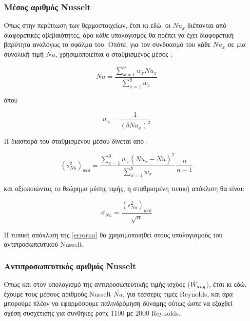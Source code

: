 \subsubsection{Μέσος αριθμός Nusselt}
\noindent Όπως στην περίπτωση των θερμοστοιχείων, έτσι κι εδώ, οι $Nu_x$ διέπονται από διαφορετικές αβεβαιότητες, άρα κάθε υπολογισμός θα πρέπει να έχει διαφορετική βαρύτητα αναλόγως το σφάλμα του. Οπότε, για τον συνδυασμό του κάθε $Nu_x$ σε μια συνολική τιμή $\overline{Nu}$, χρησιμοποιείται ο σταθμισμένος μέσος \parencites{1997_Taylor_BOOK}{2006_James_BOOK}:

\begin{equation}\label{eq:nussavg}
\overline{Nu} = \displaystyle\frac{\displaystyle\sum_{x=1}^{9} w_x Nu_x}{\displaystyle\sum_{x=1}^{9} w_x}
\end{equation}

\noindent όπου

\begin{equation*}
w_x = \displaystyle\frac{1}{\left(\delta Nu_{x}\right)^2}
\end{equation*}

\noindent Η διασπορά του σταθμισμένου μέσου δίνεται από \cite{2003_Bevington_BOOK}:

\begin{equation}\label{eq:nussvar}
\left(s_{Nu} ^2 \right)_{wtd} = \displaystyle\frac{\displaystyle\sum_{x=1}^{9} w_x \left(Nu_x - \overline{Nu}\right)^2}{\displaystyle\sum_{x = 1}^{9} w_x} \, \displaystyle\frac{n}{n-1}
\end{equation}

\noindent και αξιοποιώντας το θεώρημα μέσης τιμής, η σταθμισμένη τυπική απόκλιση θα είναι:

\begin{equation}\label{errornu}
\sigma_{\overline{Nu}} = \displaystyle\frac{\left(s_{Nu} ^2 \right)_{wtd}}{\sqrt{n}}
\end{equation}

\noindent Η τυπική απόκλιση της \ref{errornu} θα χρησιμοποιηθεί στους υπολογισμούς του αντιπροσωπευτικού Nusselt.

\subsubsection{Αντιπροσωπευτικός αριθμός Nusselt}\label{repnu}

\noindent Όπως και στον υπολογισμό της αντιπροσωπευτικής τιμής ισχύος ($\dot{W}_{\scriptsize{avg}}$), έτσι κι εδώ, έχουμε τους μέσους αριθμούς Nusselt $\overline{Nu}$, για τέσσερις τιμές Reynolds, και άρα μπορούμε πλέον να εφαρμόσουμε παλινδρόμηση δύναμης ούτως ώστε να εξαχθεί σχέση συσχέτισης για συνθήκες ροής 1100 με 2000 Reynolds.


